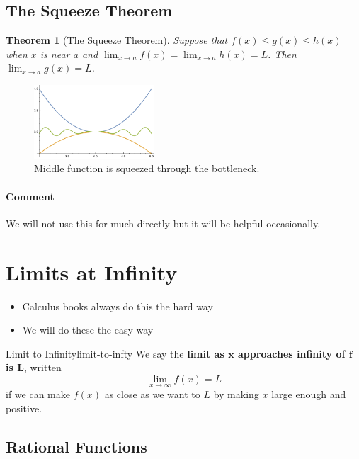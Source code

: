 \documentclass[letterpaper, 11pt, openany]{book}
\theoremstyle{mytheoremstyle}
\newtheorem{theorem}{Theorem}[section]
\theoremstyle{myexamplestyle}
\newenvironment{commentary}{\paragraph{\sffamily \smaller \fontseries{b}\selectfont Comment}}{}
\begin{document}
\subsection{The Squeeze Theorem}

\begin{theorem}[The Squeeze Theorem]\label{t:squuezethm}
    Suppose that \(f(x) \leq g(x) \leq h(x)\) when \(x\) is near \(a\) and \(\displaystyle \lim_{x \to a} f(x) = \lim_{x \to a} h(x) = L\). Then \(\displaystyle \lim_{x \to a} g(x) = L\).
\end{theorem}
\begin{figure}[htbp]
    \centering
        \includegraphics[width=0.4\textwidth]{Figures/squeezethm.pdf}
    \caption{Middle function is squeezed through the bottleneck.}
    \label{f:squeeze-thm}
\end{figure}
\begin{commentary}
    We will not use this for much directly but it will be helpful occasionally.
\end{commentary}

\section{Limits at Infinity}
\setcounter{figure}{0}

\begin{itemize}
    \item Calculus books always do this the hard way \faFrown
    \item We will do these the easy way \faSmile
\end{itemize}
\begin{definition}{Limit to Infinity}{limit-to-infty}
    We say the \textbf{limit as $\bm{x}$ approaches infinity of $\bm{f}$ is $\bm{L}$}, written
    \[
        \lim_{x \to \infty} f(x) = L    
    \]
    if we can make $f(x)$ as close as we want to $L$ by making $x$ large enough and positive.
\end{definition}
\subsection{Rational Functions}
\end{document}
